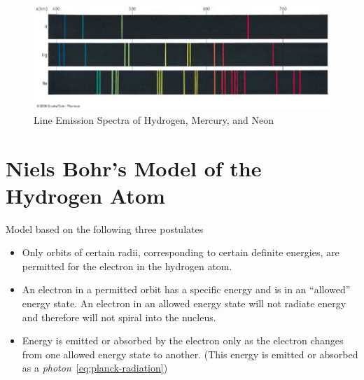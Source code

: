 \documentclass[
	chapter=7,
	title={Quantum Theory {\&} the Electronic Structure of Atoms},
	showanswers=true,
]{chem122notes}
\begin{document}
\begin{figure}[H]
	\centering
	\includegraphics[width=\textwidth]{chapter7/line-emission-spectra}
	\caption{Line Emission Spectra of Hydrogen, Mercury, and Neon}
	\label{fig:line-emission-spectra}
\end{figure}

\section{Niels Bohr's Model of the Hydrogen Atom}\label{sec:niels-bohr's-model-of-the-hydrogen-atom}
Model based on the following three postulates
\begin{itemize}
	\item Only orbits of certain radii, corresponding to certain definite energies, are permitted for the electron in the hydrogen atom.
	\item An electron in a permitted orbit has a specific energy and is in an ``allowed'' energy state.
	An electron in an allowed energy state will not radiate energy and therefore will not spiral into the nucleus.
	\item Energy is emitted or absorbed by the electron only as the electron changes from one allowed energy state to another.
	(This energy is emitted or absorbed as a \emph{photon}~\eqref{eq:planck-radiation})
\end{itemize}
\end{document}
